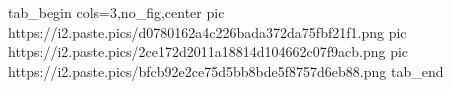  
 
 
 
 

\ifcmt
  tab_begin cols=3,no_fig,center
     pic https://i2.paste.pics/d0780162a4c226bada372da75fbf21f1.png
		 pic https://i2.paste.pics/2ce172d2011a18814d104662c07f9acb.png
		 pic https://i2.paste.pics/bfcb92e2ce75d5bb8bde5f8757d6eb88.png
  tab_end
\fi
